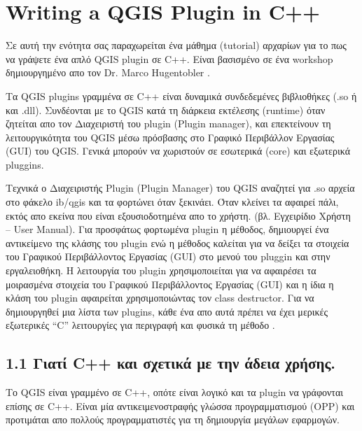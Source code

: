 \setcounter{page}{1}

\section{Writing a QGIS Plugin in C++}\label{cpp_plugin}


Σε αυτή την ενότητα σας παραχωρείται ένα μάθημα (tutorial) αρχαρίων για το πως να γράψετε ένα απλό QGIS plugin σε C++.  Είναι βασισμένο σε ένα workshop δημιουργημένο απο τον Dr. Marco Hugentobler . 

Τα QGIS plugins γραμμένα σε C++ είναι δυναμικά συνδεδεμένες βιβλιοθήκες (.so ή και .dll). Συνδέονται με το QGIS κατά τη διάρκεια εκτέλεσης (runtime) όταν ζητείται απο τον Διαχειριστή του plugin (Plugin manager), και επεκτείνουν τη λειτουργικότητα του QGIS  μέσω πρόσβασης στο Γραφικό Περιβάλλον Εργασίας (GUI) του QGIS. Γενικά μπορούν να χωριστούν σε εσωτερικά (core) και εξωτερικά pluggins. 

Τεχνικά ο Διαχειριστής Plugin (Plugin Manager) του QGIS αναζητεί για .so αρχεία στο φάκελο ib/qgis και τα φορτώνει όταν ξεκινάει. Όταν κλείνει τα αφαιρεί πάλι, εκτός απο εκείνα που είναι εξουσιοδοτημένα απο το χρήστη. (βλ. Εγχειρίδιο Χρήστη – User Manual).  Για προσφάτως φορτωμένα plugin
η  μέθοδος, δημιουργεί ένα αντικείμενο της κλάσης του plugin ενώ η μέθοδος  καλείται για να δείξει τα στοιχεία του Γραφικού Περιβάλλοντος Εργασίας (GUI) στο μενού του pluggin και στην εργαλειοθήκη. Η λειτουργία  του plugin 
χρησιμοποιείται για να αφαιρέσει τα μοιρασμένα στοιχεία του Γραφικού Περιβάλλοντος Εργασίας (GUI) και η ίδια η κλάση του plugin αφαιρείται χρησιμοποιώντας τον class destructor. Για να δημιουργηθεί μια λίστα των plugins, κάθε ένα απο αυτά πρέπει να έχει μερικές εξωτερικές “C” λειτουργίες για περιγραφή και φυσικά τη μέθοδο
.

\subsection{1.1 Γιατί C++ και σχετικά με την άδεια χρήσης.}

 Το QGIS είναι γραμμένο σε C++, οπότε είναι λογικό και τα plugin να γράφονται επίσης σε C++. Είναι μία αντικειμενοστραφής γλώσσα προγραμματισμού (OPP) και προτιμάται απο πολλούς προγραμματιστές για τη δημιουργία μεγάλων εφαρμογών.



